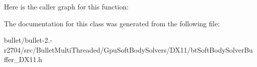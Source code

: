 Here is the caller graph for this function\+:




The documentation for this class was generated from the following file\+:\begin{DoxyCompactItemize}
\item 
bullet/bullet-\/2.-\/r2704/src/\+Bullet\+Multi\+Threaded/\+Gpu\+Soft\+Body\+Solvers/\+D\+X11/bt\+Soft\+Body\+Solver\+Buffer\+\_\+\+D\+X11.\+h\end{DoxyCompactItemize}
